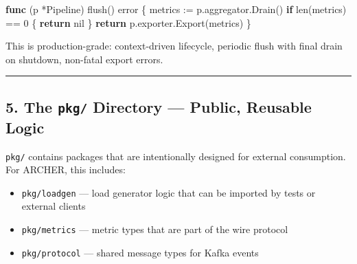 \documentclass[
]{article}
\newenvironment{Shaded}{}{}
\newcommand{\BuiltInTok}[1]{\textcolor[rgb]{0.00,0.50,0.00}{#1}}
\newcommand{\ControlFlowTok}[1]{\textcolor[rgb]{0.00,0.44,0.13}{\textbf{#1}}}
\newcommand{\DataTypeTok}[1]{\textcolor[rgb]{0.56,0.13,0.00}{#1}}
\newcommand{\DecValTok}[1]{\textcolor[rgb]{0.25,0.63,0.44}{#1}}
\newcommand{\KeywordTok}[1]{\textcolor[rgb]{0.00,0.44,0.13}{\textbf{#1}}}
\newcommand{\NormalTok}[1]{#1}
\newcommand{\OperatorTok}[1]{\textcolor[rgb]{0.40,0.40,0.40}{#1}}
\newcommand{\OtherTok}[1]{\textcolor[rgb]{0.00,0.44,0.13}{#1}}
\providecommand{\tightlist}{%
  \setlength{\itemsep}{0pt}\setlength{\parskip}{0pt}}
\begin{document}
\begin{Shaded}
\begin{Highlighting}[]
\KeywordTok{func} \OperatorTok{(}\NormalTok{p }\OperatorTok{*}\NormalTok{Pipeline}\OperatorTok{)}\NormalTok{ flush}\OperatorTok{()} \DataTypeTok{error} \OperatorTok{\{}
\NormalTok{    metrics }\OperatorTok{:=}\NormalTok{ p}\OperatorTok{.}\NormalTok{aggregator}\OperatorTok{.}\NormalTok{Drain}\OperatorTok{()}
    \ControlFlowTok{if} \BuiltInTok{len}\OperatorTok{(}\NormalTok{metrics}\OperatorTok{)} \OperatorTok{==} \DecValTok{0} \OperatorTok{\{}
        \ControlFlowTok{return} \OtherTok{nil}
    \OperatorTok{\}}
    \ControlFlowTok{return}\NormalTok{ p}\OperatorTok{.}\NormalTok{exporter}\OperatorTok{.}\NormalTok{Export}\OperatorTok{(}\NormalTok{metrics}\OperatorTok{)}
\OperatorTok{\}}
\end{Highlighting}
\end{Shaded}

This is production-grade: context-driven lifecycle, periodic flush with
final drain on shutdown, non-fatal export errors.

\begin{center}\rule{0.5\linewidth}{0.5pt}\end{center}

\hypertarget{the-pkg-directory-public-reusable-logic}{%
\subsection{\texorpdfstring{5. The \texttt{pkg/} Directory --- Public,
Reusable
Logic}{5. The pkg/ Directory --- Public, Reusable Logic}}\label{the-pkg-directory-public-reusable-logic}}

\texttt{pkg/} contains packages that are intentionally designed for
external consumption. For ARCHER, this includes:

\begin{itemize}
\tightlist
\item
  \texttt{pkg/loadgen} --- load generator logic that can be imported by
  tests or external clients
\item
  \texttt{pkg/metrics} --- metric types that are part of the wire
  protocol
\item
  \texttt{pkg/protocol} --- shared message types for Kafka events
\end{itemize}
\end{document}
